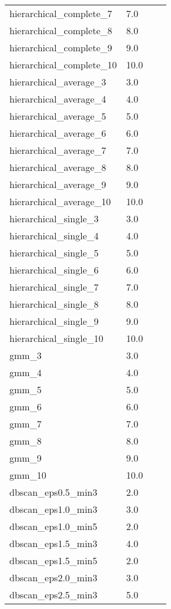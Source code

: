 \begin{tabular}{llll}
hierarchical\_complete\_7 & 7.0 &  &  \\ 
hierarchical\_complete\_8 & 8.0 &  &  \\ 
hierarchical\_complete\_9 & 9.0 &  &  \\ 
hierarchical\_complete\_10 & 10.0 &  &  \\ 
hierarchical\_average\_3 & 3.0 &  &  \\ 
hierarchical\_average\_4 & 4.0 &  &  \\ 
hierarchical\_average\_5 & 5.0 &  &  \\ 
hierarchical\_average\_6 & 6.0 &  &  \\ 
hierarchical\_average\_7 & 7.0 &  &  \\ 
hierarchical\_average\_8 & 8.0 &  &  \\ 
hierarchical\_average\_9 & 9.0 &  &  \\ 
hierarchical\_average\_10 & 10.0 &  &  \\ 
hierarchical\_single\_3 & 3.0 &  &  \\ 
hierarchical\_single\_4 & 4.0 &  &  \\ 
hierarchical\_single\_5 & 5.0 &  &  \\ 
hierarchical\_single\_6 & 6.0 &  &  \\ 
hierarchical\_single\_7 & 7.0 &  &  \\ 
hierarchical\_single\_8 & 8.0 &  &  \\ 
hierarchical\_single\_9 & 9.0 &  &  \\ 
hierarchical\_single\_10 & 10.0 &  &  \\ 
gmm\_3 & 3.0 &  &  \\ 
gmm\_4 & 4.0 &  &  \\ 
gmm\_5 & 5.0 &  &  \\ 
gmm\_6 & 6.0 &  &  \\ 
gmm\_7 & 7.0 &  &  \\ 
gmm\_8 & 8.0 &  &  \\ 
gmm\_9 & 9.0 &  &  \\ 
gmm\_10 & 10.0 &  &  \\ 
dbscan\_eps0.5\_min3 & 2.0 &  &  \\ 
dbscan\_eps1.0\_min3 & 3.0 &  &  \\ 
dbscan\_eps1.0\_min5 & 2.0 &  &  \\ 
dbscan\_eps1.5\_min3 & 4.0 &  &  \\ 
dbscan\_eps1.5\_min5 & 2.0 &  &  \\ 
dbscan\_eps2.0\_min3 & 3.0 &  &  \\ 
dbscan\_eps2.5\_min3 & 5.0 &  &  \\ 

\end{tabular}
